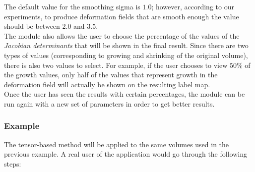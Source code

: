 The default value for the smoothing sigma is $1.0$; however, according
to our experiments, to produce deformation fields that are smooth
enough the value should be between $2.0$ and $3.5$.\\

The module also allows the user to choose the percentage of the values
of the \textit{Jacobian determinants} that will be shown in the final
result. Since there are two types of values (corresponding to growing
and shrinking of the original volume), there is also two values to
select. For example, if the user chooses to view $50\%$ of the growth
values, only half of the values that represent growth in the
deformation field will actually be shown on the resulting label map.\\

Once the user has seen the results with certain percentages, the
module can be run again with a new set of parameters in order to get
better results.

\subsubsection{Example}
The tensor-based method will be applied to the same volumes used in
the previous example. A real user of the application would go through
the following steps:

